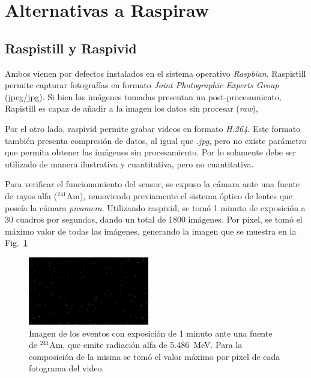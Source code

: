 \documentclass[twoside,twocolumn]{article}
\begin{document}
  \clearpage
  \appendix
  \section{Alternativas a Raspiraw}\label{sec:ap_alternatives}
  
  \subsection*{Raspistill y Raspivid}
    Ambos vienen por defectos instalados en el sistema operativo \emph{Raspbian}.
    Raspistill permite capturar fotografías en formato \emph{Joint Photographic Experts Group} (jpeg/jpg).
    Si bien las imágenes tomadas presentan un post-procesamiento, Rapistill es capaz de añadir a la imagen los datos sin procesar (\emph{raw}),

    Por el otro lado, raspivid permite grabar videos en formato \emph{H.264}.
    Este formato también presenta compresión de datos, al igual que \emph{.jpg},
    pero no existe parámetro que permita obtener las imágenes sin procesamiento.
    Por lo solamente debe ser utilizado de manera ilustrativa y cuantitativa, pero no cuantitativa.

    Para verificar el funcionamiento del sensor, se expuso la cámara ante una fuente de rayos alfa ($^{241}$Am),
    removiendo previamente el sistema óptico de lentes que poseía la cámara \emph{picamera}.
    Utilizando raspivid, se tomó 1 minuto de exposición a 30 cuadros por segundos, dando un total de 1800 imágenes.
    Por pixel, se tomó el máximo valor de todas las imágenes, generando la imagen que se muestra en la Fig.~\ref{fig:raspivid}

    \begin{figure}[h]
      \includegraphics[width=0.47\textwidth]{figures/Alpha_1m.png}
      \caption{Imagen de los eventos con exposición de 1 minuto ante una fuente de $^{241}$Am,
      que emite radiación alfa de \SI{5.486}{\mega\eV}.
      Para la composición de la misma se tomó el valor máximo por pixel de cada fotograma del video.
      }
      \label{fig:raspivid}
    \end{figure}
\end{document}
